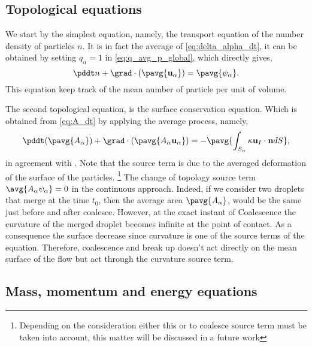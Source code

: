 \subsection{Topological equations}
We start by the simplest equation, namely, the transport equation of the number density of particles $n$. 
It is in fact the average of \ref{eq:delta_alpha_dt}, it can be obtained by setting $q_\alpha = 1$ in \ref{eq:q_avg_p_global}, which directly gives, 
\begin{equation}
    \pddt n 
    + \grad \cdot \left(
        \pavg{\textbf{u}_\alpha}
    \right) 
    = \pavg{\psi_\alpha}.
    \label{eq:avg_p_n}
\end{equation}
This equation keep track of the mean number of particle per unit of volume.

The second topological equation, is the surface conservation equation. 
Which is obtained from \ref{eq:A_dt} by applying the average process, namely, 
\begin{equation}
    \pddt (\pavg{A_\alpha})
    + \grad\cdot(\pavg{A_\alpha \textbf{u}_\alpha})
    = - \pavg{\int_{S_\alpha} \kappa \textbf{u}_I \cdot \textbf{n} dS},
    \label{eq:A_avg_p}
\end{equation}
in agreement with \citet{lhuillier2000bilan,lhuillier2003dynamics}.
Note that the source term is due to the averaged deformation of the surface of the particles.
\footnote{Depending on the consideration either this or to coalesce source term must be taken into account, this matter will be discussed in a future work} 
The change of topology source term $\avg{A_\alpha \psi_\alpha} = 0$ in the continuous approach. 
Indeed, if we consider two droplets that merge at the time $t_0$, then the average area $\pavg{A_\alpha}$, would be the same just before and after coalesce.
However, at the exact instant of Coalescence the curvature of the merged droplet becomes infinite at the point of contact.
As a consequence the surface decrease since curvature is one of the source terms of the equation. 
Therefore, coalescence and break up doesn't act directly on the mean surface of the flow but act through the curvature source term. 

\subsection{Mass, momentum and energy equations}

